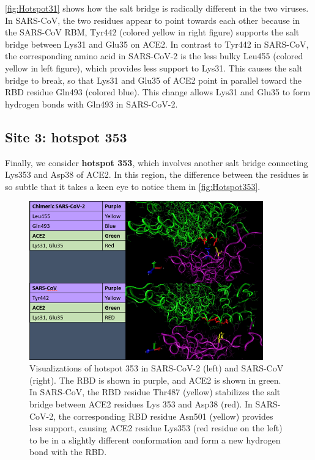\autoref{fig:Hotspot31} shows how the salt bridge is radically different in the two viruses. In SARS-CoV, the two residues appear to point towards each other because in the SARS-CoV RBM, Tyr442 (colored yellow in right figure) supports the salt bridge between Lys31 and Glu35 on ACE2. In contrast to Tyr442 in SARS-CoV, the corresponding amino acid in SARS-CoV-2 is the less bulky Leu455 (colored yellow in left figure), which provides less support to Lys31. This causes the salt bridge to break, so that Lys31 and Glu35 of ACE2 point in parallel toward the RBD residue Gln493 (colored blue). This change allows Lys31 and Glu35 to form hydrogen bonds with Gln493 in SARS-CoV-2.

\FloatBarrier
{}
\subsection{Site 3: hotspot 353}

Finally, we consider \textbf{hotspot 353}, which involves another salt bridge connecting Lys353 and Asp38 of ACE2. In this region, the difference between the residues is so subtle that it takes a keen eye to notice them in \autoref{fig:Hotspot353}.

\begin{figure}[h]
	\centering
	\mySfFamily
	\includegraphics[width = 0.9\textwidth]{../images/Hotspot31.png}
	\caption{Visualizations of hotspot 353 in SARS-CoV-2 (left) and SARS-CoV (right). The RBD is shown in purple, and ACE2 is shown in green. In SARS-CoV, the RBD residue Thr487 (yellow) stabilizes the salt bridge between ACE2 residues Lys 353 and Asp38 (red). In SARS-CoV-2, the corresponding RBD residue Asn501 (yellow) provides less support, causing ACE2 residue Lys353 (red residue on the left) to be in a slightly different conformation and form a new hydrogen bond with the RBD.}
	\label{fig:Hotspot353}
\end{figure}

